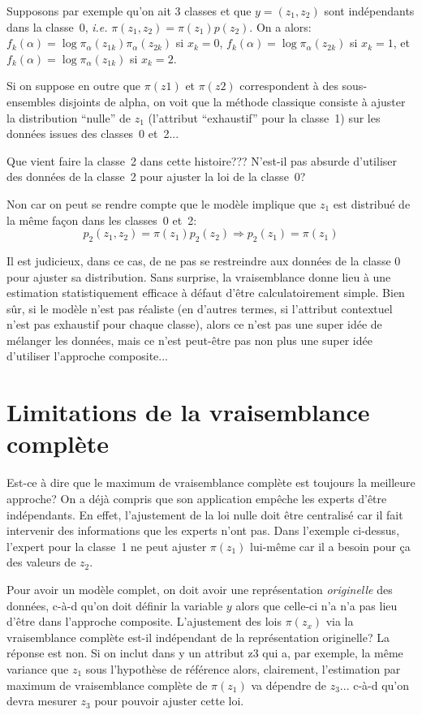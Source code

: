 \documentclass{article}
\begin{document}
Supposons par exemple qu'on ait 3 classes et que $y = (z_1, z_2)$ sont ind\'ependants dans la classe~0, {\em i.e.} $\pi(z_1, z_2) = \pi(z_1)p(z_2)$. On a alors: $f_k(\alpha) = \log \pi_\alpha(z_{1k})\pi_\alpha(z_{2k})$ si $x_k=0$, $f_k(\alpha) = \log \pi_\alpha(z_{2k})$ si $x_k=1$,  et $f_k(\alpha) = \log \pi_\alpha(z_{1k})$ si $x_k=2$.

Si on suppose en outre que $\pi(z1)$ et $\pi(z2)$ correspondent \`a des sous-ensembles disjoints de alpha, on voit que la m\'ethode classique consiste \`a ajuster la distribution ``nulle'' de $z_1$ (l'attribut ``exhaustif'' pour la classe~1) sur les donn\'ees issues des classes~0 et~2... 

Que vient faire la classe~2 dans cette histoire??? N'est-il pas absurde d'utiliser des donn\'ees de la classe~2 pour ajuster la loi de la classe~0? 

Non car on peut se rendre compte que le mod\`ele implique que $z_1$ est distribu\'e de la m\^eme fa\c{c}on dans les classes~0 et~2: 
$$
p_2(z_1, z_2) = \pi(z_1) p_2(z_2) 
\Rightarrow 
p_2(z_1) = \pi(z_1)
$$ 

Il est judicieux, dans ce cas, de ne pas se restreindre aux donn\'ees de la classe 0 pour ajuster sa distribution. Sans surprise, la vraisemblance donne lieu \`a une estimation statistiquement efficace \`a d\'efaut d'\^etre calculatoirement simple. Bien s\^ur, si le mod\`ele n'est pas r\'ealiste (en d'autres termes, si l'attribut contextuel n'est pas exhaustif pour chaque classe), alors ce n'est pas une super id\'ee de m\'elanger les donn\'ees, mais ce n'est peut-\^etre pas non plus une super id\'ee d'utiliser l'approche composite... 


\section{Limitations de la vraisemblance compl\`ete}

Est-ce \`a dire que le maximum de vraisemblance compl\`ete est toujours la meilleure approche? On a d\'ej\`a compris que son application emp\^eche les experts d'\^etre ind\'ependants. En effet, l'ajustement de la loi nulle doit \^etre centralis\'e car il fait intervenir des informations que les experts n'ont pas. Dans l'exemple ci-dessus, l'expert pour la classe~1 ne peut ajuster $\pi(z_1)$ lui-m\^eme car il a besoin pour \c{c}a des valeurs de $z_2$. 

Pour avoir un mod\`ele complet, on doit avoir une repr\'esentation {\em originelle} des donn\'ees, c-\`a-d qu'on doit d\'efinir la variable $y$ alors que celle-ci n'a n'a pas lieu d'\^etre dans l'approche composite. L'ajustement des lois $\pi(z_x)$ via la vraisemblance compl\`ete est-il ind\'ependant de la repr\'esentation originelle? La r\'eponse est non. Si on inclut dans y un attribut z3 qui a, par exemple, la m\^eme variance que $z_1$ sous l'hypoth\`ese de r\'ef\'erence alors, clairement, l'estimation par maximum de vraisemblance compl\`ete de $\pi(z_1)$ va d\'ependre de $z_3$... c-\`a-d qu'on devra mesurer $z_3$ pour pouvoir ajuster cette loi. 
\end{document}
